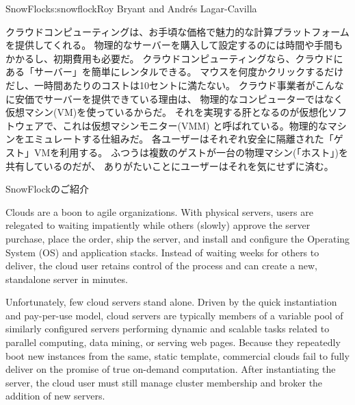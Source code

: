 \begin{aosachapter}{SnowFlock}{s:snowflock}{Roy Bryant and Andr\'e{s} Lagar-Cavilla}

クラウドコンピューティングは、お手頃な価格で魅力的な計算プラットフォームを提供してくれる。
物理的なサーバーを購入して設定するのには時間や手間もかかるし、初期費用も必要だ。
クラウドコンピューティングなら、クラウドにある「サーバー」を簡単にレンタルできる。
マウスを何度かクリックするだけだし、一時間あたりのコストは10セントに満たない。
クラウド事業者がこんなに安価でサーバーを提供できている理由は、
物理的なコンピューターではなく仮想マシン(VM)を使っているからだ。
それを実現する肝となるのが仮想化ソフトウェアで、これは仮想マシンモニター(VMM)
と呼ばれている。物理的なマシンをエミュレートする仕組みだ。
各ユーザーはそれぞれ安全に隔離された「ゲスト」VMを利用する。
ふつうは複数のゲストが一台の物理マシン(「ホスト」)を共有しているのだが、
ありがたいことにユーザーはそれを気にせずに済む。

\begin{aosasect1}{SnowFlockのご紹介}

Clouds are a boon to agile organizations. With physical servers, users
are relegated to waiting impatiently while others (slowly) approve the
server purchase, place the order, ship the server, and install and
configure the Operating System (OS) and application stacks. Instead of
waiting weeks for others to deliver, the cloud user retains control of
the process and can create a new, standalone server in minutes.

Unfortunately, few cloud servers stand alone.  Driven by the quick
instantiation and pay-per-use model, cloud servers are typically
members of a variable pool of similarly configured servers performing
dynamic and scalable tasks related to parallel computing, data mining,
or serving web pages.  Because they repeatedly boot new instances from
the same, static template, commercial clouds fail to fully deliver on
the promise of true on-demand computation. After instantiating the
server, the cloud user must still manage cluster membership and broker
the addition of new servers.


\end{aosasect1}
\end{aosachapter}
